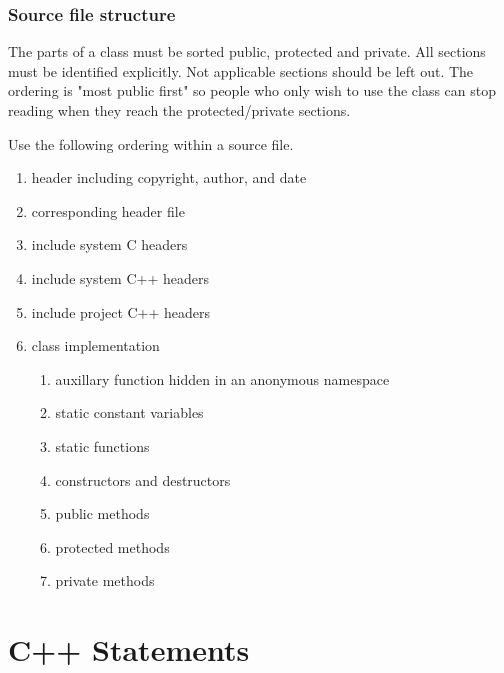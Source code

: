 \documentclass[a4paper,11pt,oneside]{scrbook}
\newcommand{\guideline}[1]{{\subsection{#1}}}
\begin{document}
\guideline{Source file structure}

The parts of a class must be sorted public, protected and private. All
sections must be identified explicitly. Not applicable sections should
be left out.  The ordering is "most public first" so people who only
wish to use the class can stop reading when they reach the
protected/private sections.

Use the following ordering within a source file.

\begin{enumerate}
  \item
    header including copyright, author, and date

  \item
    corresponding header file

  \item
    include system C headers

  \item
    include system C++ headers

  \item
    include project C++ headers

  \item
    class implementation

    \begin{enumerate}
      \item
        auxillary function hidden in an anonymous namespace

      \item
        static constant variables

      \item
        static functions

      \item
        constructors and destructors

      \item
        public methods

      \item
        protected methods

      \item
        private methods
    \end{enumerate}
\end{enumerate}

\chapter{C++ Statements}
\end{document}
